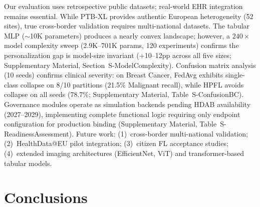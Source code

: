 \documentclass[conference]{IEEEtran}
\begin{document}
Our evaluation uses retrospective public datasets; real-world EHR integration remains essential. While PTB-XL provides authentic European heterogeneity (52 sites), true cross-border validation requires multi-national datasets. The tabular MLP ($\sim$10K parameters) produces a nearly convex landscape; however, a $240\times$ model complexity sweep (2.9K--701K params, 120 experiments) confirms the personalization gap is model-size invariant ($+$10--12pp across all five sizes; Supplementary Material, Section~S-ModelComplexity). Confusion matrix analysis (10 seeds) confirms clinical severity: on Breast Cancer, FedAvg exhibits single-class collapse on 8/10 partitions (21.5\% Malignant recall), while HPFL avoids collapse on all seeds (78.7\%; Supplementary Material, Table~S-ConfusionBC). Governance modules operate as simulation backends pending HDAB availability (2027--2029), implementing complete functional logic requiring only endpoint configuration for production binding (Supplementary Material, Table~S-ReadinessAssessment). Future work: (1)~cross-border multi-national validation; (2)~HealthData@EU pilot integration; (3)~citizen FL acceptance studies; (4)~extended imaging architectures (EfficientNet, ViT) and transformer-based tabular models.

\section{Conclusions}
\label{sec:conclusions}
\end{document}
